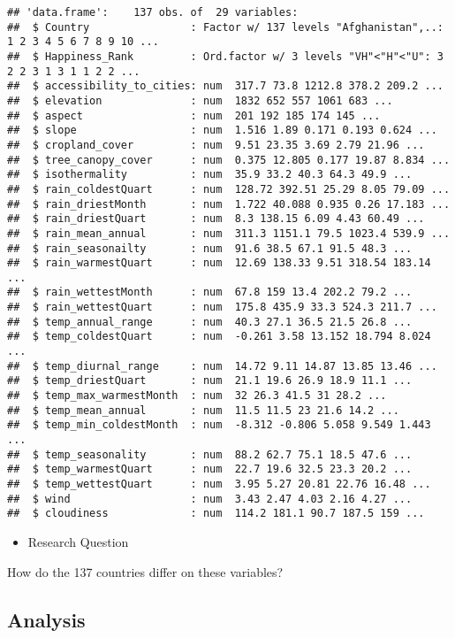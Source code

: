 \documentclass[]{article}
\providecommand{\tightlist}{%
  \setlength{\itemsep}{0pt}\setlength{\parskip}{0pt}}
\begin{document}
\begin{verbatim}
## 'data.frame':    137 obs. of  29 variables:
##  $ Country                : Factor w/ 137 levels "Afghanistan",..: 1 2 3 4 5 6 7 8 9 10 ...
##  $ Happiness_Rank         : Ord.factor w/ 3 levels "VH"<"H"<"U": 3 2 2 3 1 3 1 1 2 2 ...
##  $ accessibility_to_cities: num  317.7 73.8 1212.8 378.2 209.2 ...
##  $ elevation              : num  1832 652 557 1061 683 ...
##  $ aspect                 : num  201 192 185 174 145 ...
##  $ slope                  : num  1.516 1.89 0.171 0.193 0.624 ...
##  $ cropland_cover         : num  9.51 23.35 3.69 2.79 21.96 ...
##  $ tree_canopy_cover      : num  0.375 12.805 0.177 19.87 8.834 ...
##  $ isothermality          : num  35.9 33.2 40.3 64.3 49.9 ...
##  $ rain_coldestQuart      : num  128.72 392.51 25.29 8.05 79.09 ...
##  $ rain_driestMonth       : num  1.722 40.088 0.935 0.26 17.183 ...
##  $ rain_driestQuart       : num  8.3 138.15 6.09 4.43 60.49 ...
##  $ rain_mean_annual       : num  311.3 1151.1 79.5 1023.4 539.9 ...
##  $ rain_seasonailty       : num  91.6 38.5 67.1 91.5 48.3 ...
##  $ rain_warmestQuart      : num  12.69 138.33 9.51 318.54 183.14 ...
##  $ rain_wettestMonth      : num  67.8 159 13.4 202.2 79.2 ...
##  $ rain_wettestQuart      : num  175.8 435.9 33.3 524.3 211.7 ...
##  $ temp_annual_range      : num  40.3 27.1 36.5 21.5 26.8 ...
##  $ temp_coldestQuart      : num  -0.261 3.58 13.152 18.794 8.024 ...
##  $ temp_diurnal_range     : num  14.72 9.11 14.87 13.85 13.46 ...
##  $ temp_driestQuart       : num  21.1 19.6 26.9 18.9 11.1 ...
##  $ temp_max_warmestMonth  : num  32 26.3 41.5 31 28.2 ...
##  $ temp_mean_annual       : num  11.5 11.5 23 21.6 14.2 ...
##  $ temp_min_coldestMonth  : num  -8.312 -0.806 5.058 9.549 1.443 ...
##  $ temp_seasonality       : num  88.2 62.7 75.1 18.5 47.6 ...
##  $ temp_warmestQuart      : num  22.7 19.6 32.5 23.3 20.2 ...
##  $ temp_wettestQuart      : num  3.95 5.27 20.81 22.76 16.48 ...
##  $ wind                   : num  3.43 2.47 4.03 2.16 4.27 ...
##  $ cloudiness             : num  114.2 181.1 90.7 187.5 159 ...
\end{verbatim}

\begin{itemize}
\tightlist
\item
  Research Question
\end{itemize}

How do the 137 countries differ on these variables?

\hypertarget{analysis}{%
\subsection{Analysis}\label{analysis}}
\end{document}
